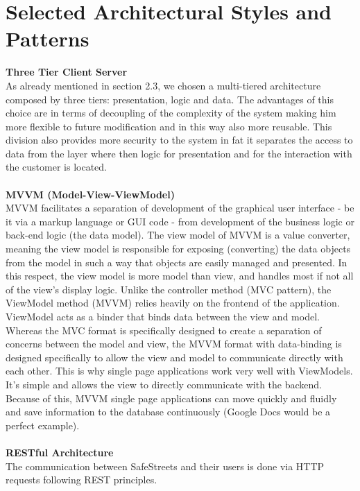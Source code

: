 \documentclass[../RASD.tex]{subfiles}
\begin{document}
    \section{Selected Architectural Styles and Patterns}\label{sec:selected-architectural-styles-and-patterns}
    \textbf{Three Tier Client Server} \\
    As already mentioned in section 2.3, we chosen a multi-tiered architecture composed by three tiers: presentation, logic and data.
    The advantages of this choice are in terms of decoupling of the complexity of the system making him more flexible to future modification
    and in this way also more reusable.
    This division also provides more security to the system in fat it separates the access to data from the layer where then logic for presentation
    and for the interaction with the customer is located.
    \\
    \\
    \textbf{MVVM (Model-View-ViewModel)} \\
    MVVM facilitates a separation of development of the graphical user interface - be it via a markup language or GUI code -
    from development of the business logic or back-end logic (the data model).
    The view model of MVVM is a value converter, meaning the view model is responsible for exposing (converting) the data objects from the model
    in such a way that objects are easily managed and presented.
    In this respect, the view model is more model than view, and handles most if not all of the view's display logic.
    Unlike the controller method (MVC pattern), the ViewModel method (MVVM) relies heavily on the frontend of the application.
    ViewModel acts as a binder that binds data between the view and model.
    Whereas the MVC format is specifically designed to create a separation of concerns between the model and view,
    the MVVM format with data-binding is designed specifically to allow the view and model to communicate directly with each other.
    This is why single page applications work very well with ViewModels.
    It’s simple and allows the view to directly communicate with the backend.
    Because of this, MVVM single page applications can move quickly and fluidly and save information to the database continuously
    (Google Docs would be a perfect example).
    \\
    \\
    \textbf{RESTful Architecture} \\
    The communication between SafeStreets and their users is done via HTTP requests following REST principles.
\end{document}
